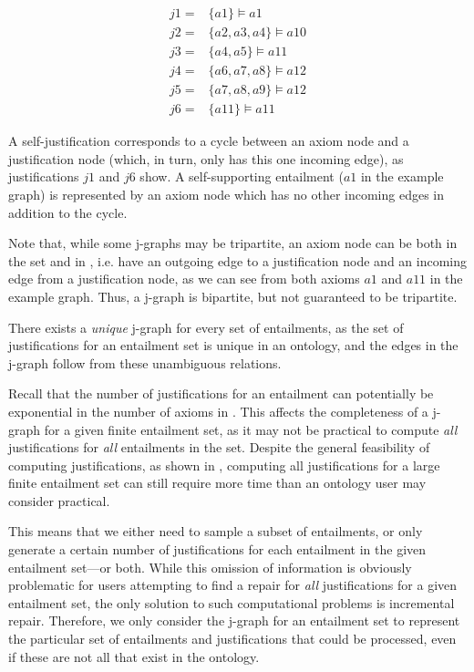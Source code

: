 \begin{examp}\label{ex:jgraph}
\begin{align*}
j1 =& \{a1\} \models a1 \\
j2 =& \{a2, a3, a4\} \models a10\\
j3 =& \{a4, a5\} \models a11 \\
j4 =& \{a6, a7, a8\} \models a12\\
j5 =& \{a7, a8, a9\} \models a12\\
j6 =& \{a11\} \models a11
\end{align*}
\end{examp}

A self-justification corresponds to a cycle between an axiom node and a justification node (which, in turn, only has this one incoming edge), as justifications $j1$ and $j6$ show. A self-supporting entailment ($a1$ in the example graph) is represented by an axiom node which has no other incoming edges in addition to the cycle. 

Note that, while some j-graphs may be tripartite, an axiom node can be both in the set \justax and in \entset, i.e. have an outgoing edge to a justification node and an incoming edge from a justification node, as we can see from both axioms $a1$ and $a11$ in the example graph. Thus, a j-graph is bipartite, but not guaranteed to be tripartite.

There exists a \emph{unique} j-graph for every set of entailments, as the set of justifications for an entailment set is unique in an ontology, and the edges in the j-graph follow from these unambiguous relations.

Recall that the number of justifications for an entailment can potentially be exponential in the number of axioms in \ont. This affects the completeness of a j-graph for a given finite entailment set, as it may not be practical to compute \emph{all} justifications for \emph{all} entailments in the set. Despite the general feasibility of computing justifications, as shown in \cite{horridge11ab}, computing all justifications for a large finite entailment set can still require more time than an ontology user may consider practical. 

This means that we either need to sample a subset of entailments, or only generate a certain number of justifications for each entailment in the given entailment set---or both. While this omission of information is obviously problematic for users attempting to find a repair for \emph{all} justifications for a given entailment set, the only solution to such computational problems is incremental repair. Therefore, we only consider the j-graph for an entailment set to represent the particular set of entailments and justifications that could be processed, even if these are not all that exist in the ontology.


